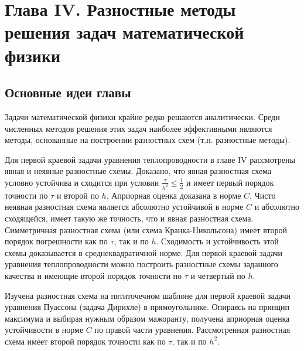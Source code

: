 \newpage
{}
\pagestyle{empty}
\vspace{0.5cm}

\section*{Глава IV. Разностные методы решения задач математической физики}

\subsection{Основные идеи главы}

Задачи математической физики крайне редко решаются аналитически. Среди численных методов решения этих задач наиболее эффективными являются методы, основанные на построении разностных схем (т.н. разностные методы).

Для первой краевой задачи уравнения теплопроводности в главе IV рассмотрены явная и неявные разностные схемы. Доказано, что явная разностная схема условно устойчива и сходится при условии \begin{math} \frac{\tau}{h^2} \leq \frac{1}{2} \end{math} и имеет первый порядок точности по $\tau$ и второй по $h$. Априорная оценка доказана в норме $C$. Чисто неявная разностная схема является абсолютно устойчивой в норме $C$ и абсолютно сходящейся, имеет такую же точность, что и явная разностная схема. Симметричная разностная схема (или схема Кранка-Никольсона) имеет второй порядок погрешности как по $\tau$, так и по $h$. Сходимость и устойчивость этой схемы доказывается в среднеквадратичной норме. Для первой краевой задачи уравнения теплопроводности можно построить разностные схемы заданного качества и имеющие второй порядок точности по $\tau$ и четвертый по $h$.

Изучена разностная схема на пятиточечном шаблоне для первой краевой задачи уравнения Пуассона (задача Дирихле) в прямоугольнике. Опираясь на принцип максимума и выбирая нужным образом мажоранту, получена априорная оценка устойчивости в норме $C$ по правой части уравнения. Рассмотренная разностная схема имеет второй порядок точности как по $\tau$, так и по \begin{math} h^2 \end{math}.

